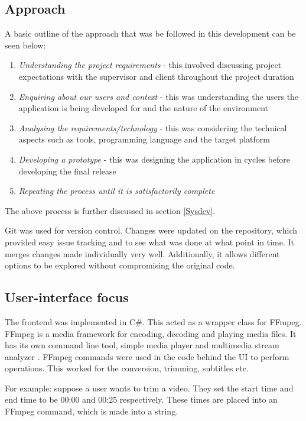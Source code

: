 \documentclass{sig-alternate-05-2015}
\begin{document}
\subsection{Approach}
A basic outline of the approach that was be followed in this development can be seen below:
\begin{enumerate}
  \item \textit{Understanding the project requirements} - this involved discussing project expectations with the supervisor and client throughout the project duration
  \item \textit{Enquiring about our users and context} - this was understanding the users the application is being developed for and the nature of the environment
  \item \textit{Analysing the requirements/technology} - this was considering the technical aspects such as tools, programming language and the target platform
  \item \textit{Developing a prototype} - this was designing the application in cycles before developing the final release
  \item \textit{Repeating the process until it is satisfactorily complete}
\end{enumerate}

The above process is further discussed in section \ref{Sysdev}.

Git was used for version control. Changes were updated on the repository, which provided easy issue tracking and to see what was done at what point in time. It merges changes made individually very well. Additionally, it allows different options to be explored without compromising the original code.

\subsection{User-interface focus}
The frontend was implemented in C\#. This acted as a wrapper class for FFmpeg. FFmpeg is a media framework for encoding, decoding and playing media files. It has its own command line tool, simple media player and multimedia stream analyzer \cite{bellard2012ffmpeg}. FFmpeg commands were used in the code behind the UI to perform operations. This worked for the conversion, trimming, subtitles etc.

For example: suppose a user wants to trim a video. They set the start time and end time to be 00:00 and 00:25 respectively. These times are placed into an FFmpeg command, which is made into a string.
\end{document}

